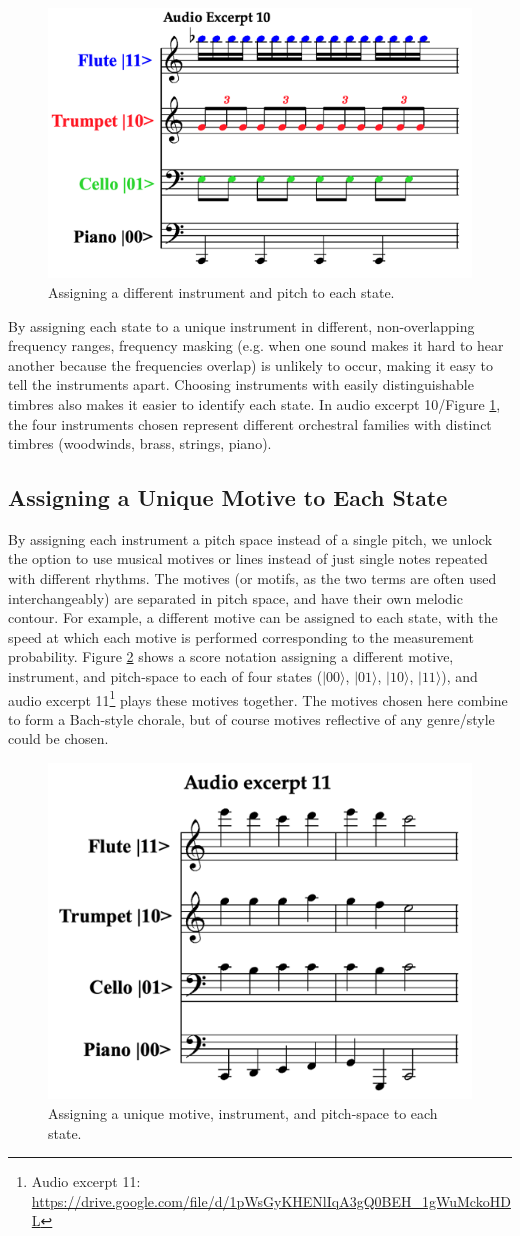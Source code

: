 \documentclass[10pt,twocolumn]{article}
\begin{document}
\begin{figure}[h]
\centering
  \includegraphics[width=.45\textwidth]{fig/Figure 5.png}
        \caption{Assigning a different instrument and pitch to each state.}
\label{fig:Figure5}
\end{figure}

By assigning each state to a unique instrument in different, non-overlapping frequency ranges, frequency masking (e.g. when one sound makes it hard to hear another because the frequencies overlap) is unlikely to occur, making it easy to tell the instruments apart\cite{smyth2019}. Choosing instruments with easily distinguishable timbres also makes it easier to identify each state. In audio excerpt 10/Figure \ref{fig:Figure5}, the four instruments chosen represent different orchestral families with distinct timbres (woodwinds, brass, strings, piano). 

\subsection{Assigning a Unique Motive to Each State}

By assigning each instrument a pitch space instead of a single pitch, we unlock the option to use musical motives or lines instead of just single notes repeated with different rhythms. The motives (or motifs, as the two terms are often used interchangeably) are separated in pitch space, and have their own melodic contour. For example, a different motive can be assigned to each state, with the speed at which each motive is performed corresponding to the measurement probability. Figure \ref{fig:Figure6} shows a score notation assigning a different motive, instrument, and pitch-space to each of four states ($|00\rangle$, $|01\rangle$, $|10\rangle$, $|11\rangle$), and audio excerpt 11\footnote{Audio excerpt 11: \url{https://drive.google.com/file/d/1pWsGyKHENlIqA3gQ0BEH_1gWuMckoHDL}} plays these motives together. The motives chosen here combine to form a Bach-style chorale, but of course motives reflective of any genre/style could be chosen.

\begin{figure}[h]
\centering
  \includegraphics[width=.45\textwidth]{fig/Figure 6.png}
        \caption{Assigning a unique motive, instrument, and pitch-space to each state.}
\label{fig:Figure6}
\end{figure}
\end{document}
